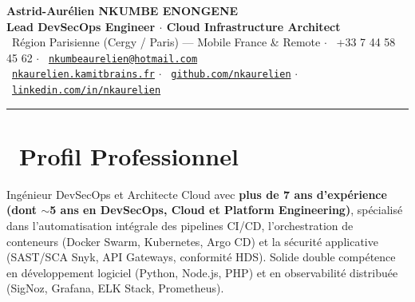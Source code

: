 \documentclass[10pt,a4paper]{article}
\begin{document}
\begin{center}
    {\LARGE\bfseries\color{primary} Astrid-Aurélien NKUMBE ENONGENE}\\[0.25em]
    {\large\bfseries\color{darkgray} Lead DevSecOps Engineer $\cdot$ Cloud Infrastructure Architect}\\[0.4em]
    {\footnotesize\color{slateGray}
        \faMapMarker*\ Région Parisienne (Cergy / Paris) --- Mobile France \& Remote \quad$\cdot$\quad
        \faPhone*\ +33 7 44 58 45 62 \quad$\cdot$\quad
        \faEnvelope\ \href{mailto:nkumbeaurelien@hotmail.com}{\texttt{nkumbeaurelien@hotmail.com}}\\[0.25em]
        \faGlobe\ \href{https://nkaurelien.kamitbrains.fr}{\texttt{nkaurelien.kamitbrains.fr}} \quad$\cdot$\quad
        \faGithub\ \href{https://github.com/nkaurelien}{\texttt{github.com/nkaurelien}} \quad$\cdot$\quad
        \faLinkedin\ \href{https://www.linkedin.com/in/nkaurelien/}{\texttt{linkedin.com/in/nkaurelien}}
    }
\end{center}

\vspace{0.1em}
\textcolor{ruleGray}{\rule{\linewidth}{1pt}}
\vspace{0.35em}

\section{\faLightbulb\ Profil Professionnel}
Ingénieur DevSecOps et Architecte Cloud avec \textbf{plus de 7 ans d'expérience (dont $\sim$5 ans en DevSecOps, Cloud et Platform Engineering)}, spécialisé dans l'automatisation intégrale des pipelines CI/CD, l'orchestration de conteneurs (Docker Swarm, Kubernetes, Argo CD) et la sécurité applicative (SAST/SCA Snyk, API Gateways, conformité HDS). Solide double compétence en développement logiciel (Python, Node.js, PHP) et en observabilité distribuée (SigNoz, Grafana, ELK Stack, Prometheus).

\end{document}

